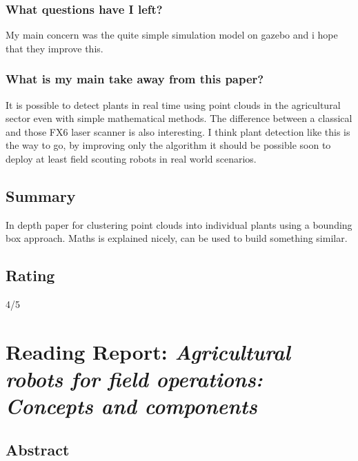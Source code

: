 \documentclass{article}
\begin{document}
\subsubsection*{What questions have I left?}
My main concern was the quite simple simulation model on gazebo and i hope that they improve this.
\subsubsection*{What is my main take away from this paper?}
It is possible to detect plants in real time using point clouds in the agricultural sector even with 
simple mathematical methods. The difference between a classical and those FX6 laser scanner is also interesting.
I think plant detection like this is the way to go, by improving only the algorithm it should be possible
soon to deploy at least field scouting robots in real world scenarios. 

\subsection*{Summary}
In depth paper for clustering point clouds into individual plants using a bounding box approach.
Maths is explained nicely, can be used to build something similar.

\subsection*{Rating}
4/5

\section{Reading Report: \emph{Agricultural robots for field operations: Concepts and components}}
\cite{Bechar2016}

\subsection*{Abstract}
\end{document}
